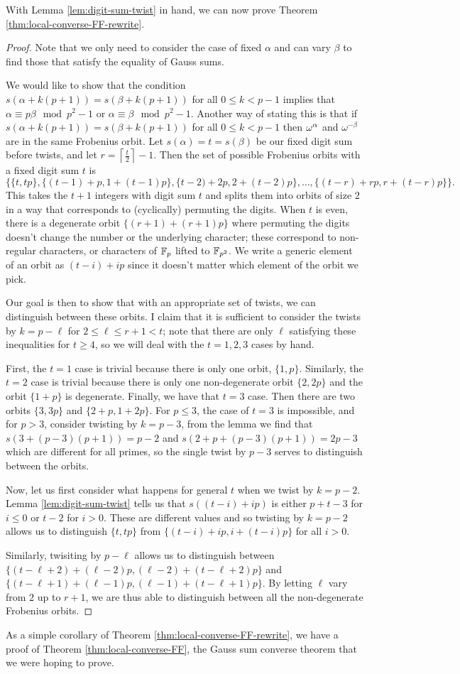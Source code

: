 With Lemma \ref{lem:digit-sum-twist} in hand, we can now prove Theorem \ref{thm:local-converse-FF-rewrite}.
\begin{proof}
Note that we only need to consider the case of fixed $\alpha$ and can vary $\beta$ to find those that satisfy the equality of Gauss sums. 

We would like to show that the condition $s(\alpha + k(p+1)) = s(\beta + k(p+1))$ for all $0 \leq k < p-1$ implies that $\alpha \equiv p \beta \mod p^2 -1$ or $\alpha \equiv \beta \mod p^2 - 1$. 
Another way of stating this is that if $s(\alpha + k(p+1)) = s(\beta+k(p+1))$ for all $0 \leq k < p-1$ then $\omega^{\-\alpha}$ and $\omega^{-\beta}$ are in the same Frobenius orbit.
Let $s(\alpha) = t = s(\beta)$ be our fixed digit sum before twists, and let $r = \left \lceil \frac{t}{2} \right \rceil - 1$.
Then the set of possible Frobenius orbits with a fixed digit sum $t$ is 
\[\{\{t,tp\}, \{(t-1)+p, 1 + (t-1)p\},\{t-2)+2p, 2+(t-2)p\}, \ldots, \{(t-r)+rp, r + (t-r)p\}\}.\]
This takes the $t+1$ integers with digit sum $t$ and splits them into orbits of size $2$ in a way that corresponds to (cyclically) permuting the digits.
When $t$ is even, there is a degenerate orbit $\{(r+1)+(r+1)p\}$ where permuting the digits doesn't change the number or the underlying character; these correspond to non-regular characters, or characters of $\mathbb{F}_p$ lifted to $\mathbb{F}_{p^2}$.
We write a generic element of an orbit as $(t - i) +ip$ since it doesn't matter which element of the orbit we pick.

Our goal is then to show that with an appropriate set of twists, we can distinguish between these orbits.
I claim that it is sufficient to consider the twists by $k = p - \ell$ for $2 \leq \ell \leq r +1 < t$; note that there are only $\ell$ satisfying these inequalities for $t \geq 4$, so we will deal with the $t = 1,2,3$ cases by hand.

First, the $t = 1$ case is trivial because there is only one orbit, $\{1,p\}$.
Similarly, the $t = 2$ case is trivial because there is only one non-degenerate orbit $\{2,2p\}$ and the orbit $\{1+p\}$ is degenerate.
Finally, we have that $t = 3$ case.
Then there are two orbits $\{3,3p\}$ and $\{2+p,1+2p\}$.
For $p \leq 3$, the case of $t = 3$ is impossible, and for $p > 3$, consider twisting by $k = p-3$, from the lemma we find that $s(3 + (p-3)(p+1)) = p-2$ and $s(2 + p + (p-3)(p+1)) = 2p-3$ which are different for all primes, so the single twist by $p-3$ serves to distinguish between the orbits.

Now, let us first consider what happens for general $t$ when we twist by $k = p-2$.
Lemma \ref{lem:digit-sum-twist} tells us that $s((t-i)+ip)$ is either $p+t-3$ for $i \leq 0$ or $t - 2$ for $i > 0$.
These are different values and so twisting by $k = p-2$ allows us to distinguish $\{t,tp\}$ from $\{(t-i)+ip,i+(t-i)p\}$ for all $i > 0$.

Similarly, twisiting by $p - \ell$ allows us to distinguish between $\{(t-\ell+2)+(\ell-2)p,(\ell-2) + (t-\ell+2)p\}$ and $\{(t-\ell+1)+(\ell-1)p,(\ell-1)+(t-\ell+1)p\}$.
By letting $\ell$ vary from $2$ up to $r+1$, we are thus able to distinguish between all the non-degenerate Frobenius orbits.
\end{proof}

As a simple corollary of Theorem \ref{thm:local-converse-FF-rewrite}, we have a proof of Theorem \ref{thm:local-converse-FF}, the Gauss sum converse theorem that we were hoping to prove.


\endinput
